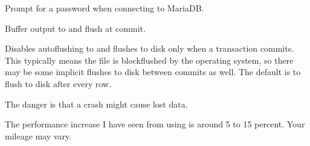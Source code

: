 \documentclass[letterpaper,10pt,english]{sphinxmanual}
\begin{document}

\begin{fulllineitems}
\label{\detokenize{mariadb-archiver:cmdoption-mariadb-archiver-ask-pass}}
Prompt for a password when connecting to MariaDB.

\end{fulllineitems}


\begin{fulllineitems}
\label{\detokenize{mariadb-archiver:cmdoption-mariadb-archiver-buffer}}
Buffer output to {\hyperref[\detokenize{mariadb-archiver:cmdoption-mariadb-archiver-file}]{}} and flush at commit.

Disables autoflushing to {\hyperref[\detokenize{mariadb-archiver:cmdoption-mariadb-archiver-file}]{}} and flushes {\hyperref[\detokenize{mariadb-archiver:cmdoption-mariadb-archiver-file}]{}} to disk only when a
transaction commits.  This typically means the file is block\sphinxhyphen{}flushed by the
operating system, so there may be some implicit flushes to disk between
commits as well.  The default is to flush {\hyperref[\detokenize{mariadb-archiver:cmdoption-mariadb-archiver-file}]{}} to disk after every row.

The danger is that a crash might cause lost data.

The performance increase I have seen from using {\hyperref[\detokenize{mariadb-archiver:cmdoption-mariadb-archiver-buffer}]{}} is around 5 to 15
percent.  Your mileage may vary.

\end{fulllineitems}
\end{document}
